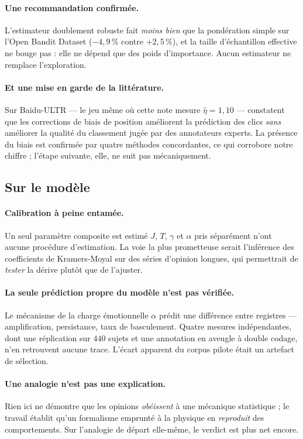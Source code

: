 \documentclass[11pt,a4paper]{article}
\begin{document}
\paragraph{Une recommandation confirmée.} L'estimateur doublement robuste fait \emph{moins bien}
que la pondération simple sur l'Open Bandit Dataset ($-4{,}9\,\%$ contre $+2{,}5\,\%$), et la
taille d'échantillon effective ne bouge pas : elle ne dépend que des poids d'importance. Aucun
estimateur ne remplace l'exploration.

\paragraph{Et une mise en garde de la littérature.} Sur Baidu-ULTR --- le jeu même où cette note
mesure $\hat\eta = 1{,}10$ --- \citet{hager2024} constatent que les corrections de biais de
position améliorent la prédiction des clics \emph{sans} améliorer la qualité du classement jugée
par des annotateurs experts. La présence du biais est confirmée par quatre méthodes concordantes,
ce qui corrobore notre chiffre ; l'étape suivante, elle, ne suit pas mécaniquement.

\subsection{Sur le modèle}

\paragraph{Calibration à peine entamée.} Un seul paramètre composite est estimé
$J$, $T$, $\gamma$ et $\alpha$ pris séparément n'ont aucune
procédure d'estimation. La voie la plus prometteuse serait l'inférence des coefficients de
Kramers-Moyal sur des séries d'opinion longues, qui permettrait de \emph{tester} la dérive
plutôt que de l'ajuster.

\paragraph{La seule prédiction propre du modèle n'est pas vérifiée.} Le mécanisme de la charge
émotionnelle $\alpha$ prédit une différence entre registres --- amplification, persistance,
taux de basculement. Quatre mesures indépendantes, dont une réplication sur $440$ sujets et une
annotation en aveugle à double codage, n'en retrouvent aucune trace. L'écart apparent du
corpus pilote était un artefact de sélection.

\paragraph{Une analogie n'est pas une explication.} Rien ici ne démontre que les opinions
\emph{obéissent} à une mécanique statistique ; le travail établit qu'un formalisme emprunté à
la physique en \emph{reproduit} des comportements. Sur l'analogie de départ elle-même, le
verdict est plus net encore.
\end{document}

